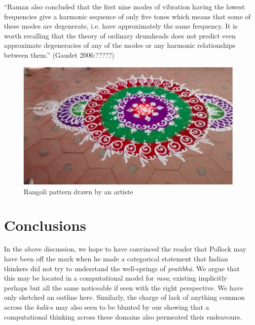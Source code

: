 \begin{myquote}
“Raman also concluded that the first nine modes of vibration having the lowest frequencies give a harmonic sequence of only five tones which means that some of these modes are degenerate, i.e. have approximately the same frequency. It is worth recalling that the theory of ordinary drumheads does not predict even approximate degeneracies of any of the modes or any harmonic relationships between them.” (Gaudet 2006:?????)
\end{myquote}
\begin{figure}[H]
\centering
\includegraphics[scale=.8]{figures/8.eps}
\caption{Rangoli pattern drawn by an artiste}\label{chap3-fig6}
\end{figure}

\section{Conclusions}\label{chap3-sec6}

In the above discussion, we hope to have convinced the reader that Pollock may have been off the mark when he made a categorical statement that Indian thinkers did not try to understand the well-springs of \textsl{pratibhā}. We argue that this may be located in a computational model for \textsl{rasa}; existing implicitly perhaps but all the same noticeable if seen with the right perspective. We have only sketched an outline here. Similarly, the charge of lack of anything common across the \textsl{kalā}-s may also seen to be blunted by our showing that a computational thinking across these domains also permeated their endeavours.


